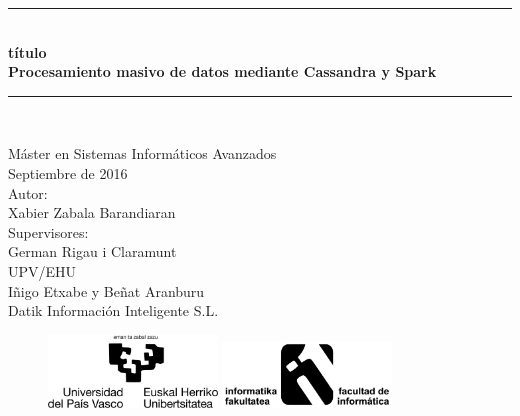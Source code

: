 \pagestyle{empty}

\newcommand{\HRule}{\rule{\linewidth}{0.5mm}} 

\begin{center}
	\HRule \\[0.5cm]
	\vspace{0.5cm}
	\textbf {
		{\huge título}\\
		\vspace{0.3 cm}
		Procesamiento masivo de datos mediante Cassandra y Spark\\
	}
	\vspace{0.5cm}
	\HRule \\[0.5cm]
	{\large
		
		\vspace{1 cm}
		Máster en Sistemas Informáticos Avanzados\\
		Septiembre de 2016\\
		\vspace{3.0 cm}
		Autor:\\
		\vspace{0.2 cm}
		Xabier Zabala Barandiaran\\
		\vspace{1.0 cm}
		Supervisores:\\
		\vspace{0.2 cm}
		German Rigau i Claramunt\\
		{\small UPV/EHU\\}
		Iñigo Etxabe y Beñat Aranburu\\
		{\small Datik Información Inteligente S.L.\\}
	}

	\vspace{2.0 cm} 
	\begin{figure}[h!]
		\centering
		\includegraphics[width=0.4\textwidth]{Ilustraciones/ehu.png}\hfill
		\includegraphics[width=0.4\textwidth]{Ilustraciones/informatica.png}\hfill

	\end{figure}
\end{center}